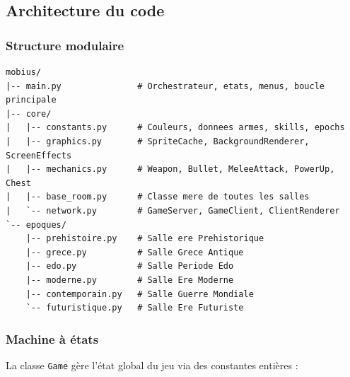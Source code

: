 \documentclass[12pt,a4paper]{article}
\begin{document}
\subsection{Architecture du code}

\subsubsection*{Structure modulaire}

\begin{mdframed}[
  linecolor=framegray,
  linewidth=0.8pt,
  backgroundcolor=codelisting,
  innerleftmargin=12pt,
  innerrightmargin=12pt,
  innertopmargin=8pt,
  innerbottommargin=8pt,
]
\begin{verbatim}
mobius/
|-- main.py               # Orchestrateur, etats, menus, boucle principale
|-- core/
|   |-- constants.py      # Couleurs, donnees armes, skills, epochs
|   |-- graphics.py       # SpriteCache, BackgroundRenderer, ScreenEffects
|   |-- mechanics.py      # Weapon, Bullet, MeleeAttack, PowerUp, Chest
|   |-- base_room.py      # Classe mere de toutes les salles
|   `-- network.py        # GameServer, GameClient, ClientRenderer
`-- epoques/
    |-- prehistoire.py    # Salle ere Prehistorique
    |-- grece.py          # Salle Grece Antique
    |-- edo.py            # Salle Periode Edo
    |-- moderne.py        # Salle Ere Moderne
    |-- contemporain.py   # Salle Guerre Mondiale
    `-- futuristique.py   # Salle Ere Futuriste
\end{verbatim}
\end{mdframed}

\subsubsection*{Machine à états}

La classe \texttt{Game} gère l'état global du jeu via des constantes entières :
\end{document}
